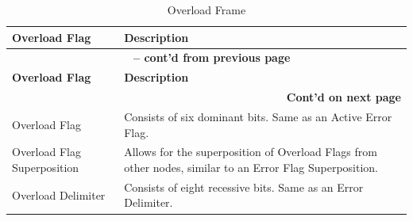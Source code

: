 \begin{longtable}[c]{|p{4.5cm}|p{12cm}|} 
    
  \caption{Overload Frame}
  \label{tab:twai-overload-frame} 
  \\\hline
  \rowcolor{lightgray}
  \textbf{Overload Flag} & \textbf{Description}
  \\\hline
  \endfirsthead
  
  \multicolumn{2}{c}{\bfseries \tablename\ \thetable{} -- cont'd from previous page}\\  \hline
  
  \rowcolor{lightgray}
    \textbf{Overload Flag} & \textbf{Description}
  \\\hline
  \endhead
  
  \multicolumn{2}{r}{\textbf{Cont'd on next page}} \\
  \endfoot
  \endlastfoot
  
    Overload Flag & Consists of six dominant bits. Same as an Active Error Flag.
          \\\hline
    Overload Flag Superposition & Allows for the superposition of Overload Flags from other nodes, similar to an Error Flag Superposition.
           \\\hline
    Overload Delimiter & Consists of eight recessive bits. Same as an Error Delimiter.              \\\hline
\end{longtable}
